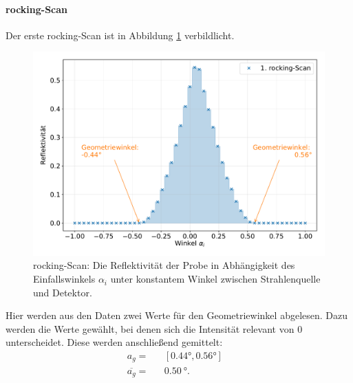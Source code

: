 \FloatBarrier
\paragraph{rocking-Scan}
Der erste rocking-Scan ist in Abbildung \ref{fig:rock} verbildlicht.
\begin{figure}[H]
  \centering
  \includegraphics[width=\textwidth]{content/images/done_plot_rockingscan.pdf}
  \caption{rocking-Scan: Die Reflektivität der Probe in Abhängigkeit des Einfallswinkels $\alpha_i$ unter konstantem Winkel zwischen Strahlenquelle und Detektor.}
  \label{fig:rock}
\end{figure}
Hier werden aus den Daten zwei Werte für den Geometriewinkel abgelesen.
Dazu werden die Werte gewählt, bei denen sich die Intensität relevant von 0 unterscheidet.
Diese werden anschließend gemittelt:
\begin{align*}
	& a_g 			   = && [0.44°, 0.56°] && \\
	& \overline{a_g}   = && \SI{0.50}{°}.  && \\
\end{align*}

